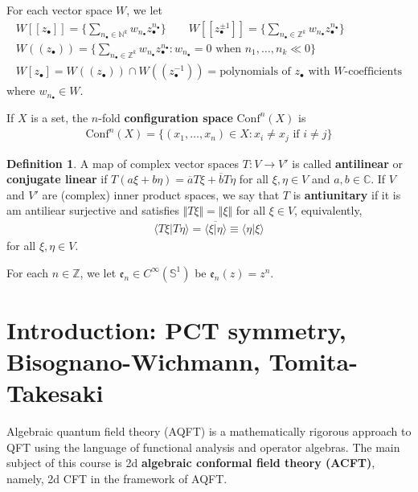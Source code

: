 \documentclass[12pt,b5paper,notitlepage]{article}
\theoremstyle{definition}
\newtheorem{df}{Definition}[section]
\theoremstyle{plain}
\newcommand{\ovl}{\overline}
\newcommand{\Conf}{\mathrm{Conf}}
\newcommand{\bk}[1]{\langle {#1}\rangle}
\newcommand{\blt}{\bullet}
\newcommand{\Cbb}{\mathbb C}
\newcommand{\Nbb}{\mathbb N}
\newcommand{\Zbb}{\mathbb Z}
\newcommand{\Sbb}{{\mathbb S}}
\newcommand{\ek}{\mathfrak{e}}
\numberwithin{equation}{section}
\begin{document}
For each vector space $W$, we let
\begin{gather*}
W[[z_\blt]]=\Big\{\sum_{n_\blt\in\Nbb^k} w_{n_\blt}z_\blt^{n_\blt} \Big\}\qquad W[[z_\blt^{\pm1}]]=\Big\{\sum_{n_\blt\in\Zbb^k} w_{n_\blt}z_\blt^{n_\blt} \Big\}\\
W((z_\blt))=\Big\{\sum_{n_\blt\in\Zbb^k} w_{n_\blt}z_\blt^{n_\blt}:w_{n_\blt}=0\text{ when }n_1,\dots,n_k\ll 0 \Big\}\\
W[z_\blt]=W((z_\blt))\cap W((z_\blt^{-1}))=\text{polynomials of $z_\blt$ with $W$-coefficients}
\end{gather*}
where $w_{n_\blt}\in W$.


If $X$ is a set, the $n$-fold \textbf{configuration space}  $\Conf^n(X)$ \index{Conf@$\Conf^n(X)$} is
\begin{align}
\Conf^n(X)=\{(x_1,\dots,x_n)\in X:x_i\neq x_j\text{ if }i\neq j\}
\end{align}

\begin{df}
A map of complex vector spaces $T:V\rightarrow V'$ is called \textbf{antilinear}  or \textbf{conjugate linear} if $T(a\xi+b\eta)=\ovl aT\xi+\ovl bT\eta$ for all $\xi,\eta\in V$ and $a,b\in\Cbb$. If $V$ and $V'$ are (complex) inner product spaces, we say that $T$ is \textbf{antiunitary}  if it is am antiliear surjective and satisfies $\Vert T\xi\Vert=\Vert\xi\Vert$ for all $\xi\in V$, equivalently,
\begin{align}\label{eq14}
\bk{T\xi|T\eta}=\ovl{\bk{\xi|\eta}}\equiv\bk{\eta|\xi}
\end{align}
for all $\xi,\eta\in V$.
\end{df}

For each $n\in\Zbb$, we let $\ek_n\in C^\infty(\Sbb^1)$ be $\ek_n(z)=z^n$.



\newpage



\section{Introduction: PCT symmetry, Bisognano-Wichmann, Tomita-Takesaki}


Algebraic quantum field theory (AQFT) is a mathematically rigorous approach to QFT using the language of functional analysis and operator algebras. The main subject of this course is 2d \textbf{algebraic conformal field theory (ACFT)}, namely, 2d CFT in the framework of AQFT.
\end{document}
